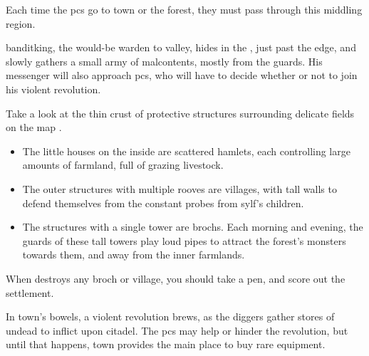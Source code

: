 \label{sqList}

\begin{multicols}{2}
\noindent
Each time the \glspl{pc} go to \gls{town} or the forest, they must pass through this middling \gls{region}.

\Gls{banditking}, the would-be \gls{warden} to \gls{valley}, hides in the , just past the \gls{edge}, and slowly gathers a small army of malcontents, mostly from the \glspl{guard}.
His messenger will also approach \glspl{pc}, who will have to decide whether or not to join his violent revolution.

Take a look at the thin crust of protective structures surrounding delicate fields on the map .

\begin{itemize}
  \item
  The little houses on the inside are scattered hamlets, each controlling large amounts of farmland, full of grazing livestock.
  \item
  The outer structures with multiple rooves are \glspl{village}, with tall walls to defend themselves from the constant probes from \gls{sylf}'s children.
  \item
  The structures with a single tower are \glspl{broch}.
  Each morning and evening, the \glspl{guard} of these tall towers play loud pipes to attract the forest's \glspl{monster} towards them, and away from the inner farmlands.
\end{itemize}

When  destroys any \gls{broch} or \gls{village}, you should take a pen, and score out the settlement.

\end{multicols}


\begin{multicols}{2}
\noindent
In \gls{town}'s bowels, a violent revolution brews, as the \glspl{digger} gather stores of undead to inflict upon \gls{citadel}.
The \glspl{pc} may help or hinder the revolution, but until that happens, \gls{town} provides the main place to buy rare equipment.

\end{multicols}

\bigLine



